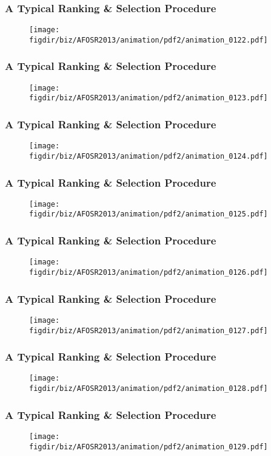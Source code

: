 \documentclass[13pt]{beamer}
\newcommand{\figdir}{../../fig}
\begin{document}
{\begin{frame}\frametitle{A Typical Ranking \& Selection Procedure}\begin{figure}\texttt{[image: \\figdir/biz/AFOSR2013/animation/pdf2/animation\_0122.pdf]}\end{figure}\end{frame}
\begin{frame}\frametitle{A Typical Ranking \& Selection Procedure}\begin{figure}\texttt{[image: \\figdir/biz/AFOSR2013/animation/pdf2/animation\_0123.pdf]}\end{figure}\end{frame}
\begin{frame}\frametitle{A Typical Ranking \& Selection Procedure}\begin{figure}\texttt{[image: \\figdir/biz/AFOSR2013/animation/pdf2/animation\_0124.pdf]}\end{figure}\end{frame}
\begin{frame}\frametitle{A Typical Ranking \& Selection Procedure}\begin{figure}\texttt{[image: \\figdir/biz/AFOSR2013/animation/pdf2/animation\_0125.pdf]}\end{figure}\end{frame}
\begin{frame}\frametitle{A Typical Ranking \& Selection Procedure}\begin{figure}\texttt{[image: \\figdir/biz/AFOSR2013/animation/pdf2/animation\_0126.pdf]}\end{figure}\end{frame}
\begin{frame}\frametitle{A Typical Ranking \& Selection Procedure}\begin{figure}\texttt{[image: \\figdir/biz/AFOSR2013/animation/pdf2/animation\_0127.pdf]}\end{figure}\end{frame}
\begin{frame}\frametitle{A Typical Ranking \& Selection Procedure}\begin{figure}\texttt{[image: \\figdir/biz/AFOSR2013/animation/pdf2/animation\_0128.pdf]}\end{figure}\end{frame}
\begin{frame}\frametitle{A Typical Ranking \& Selection Procedure}\begin{figure}\texttt{[image: \\figdir/biz/AFOSR2013/animation/pdf2/animation\_0129.pdf]}\end{figure}\end{frame}
}
\end{document}
